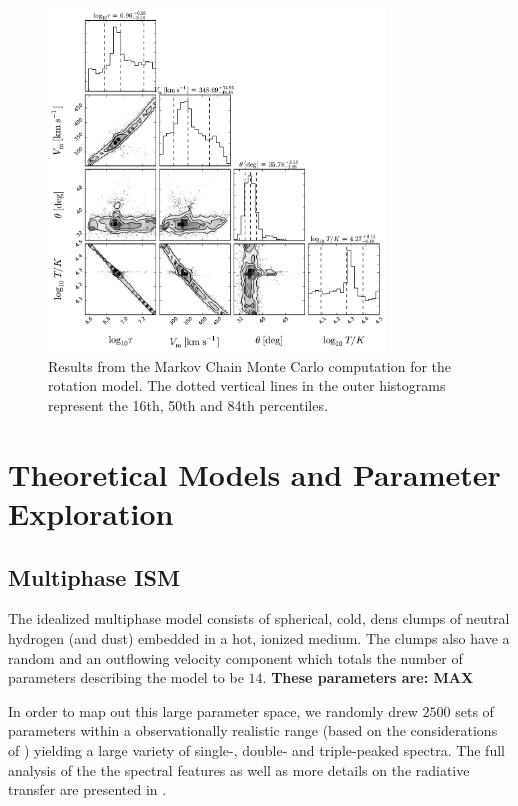 \documentclass[a4,useAMS,usenatbib,usegraphicx]{mn2e}
\begin{document}
\begin{figure}
\begin{center}
\includegraphics[width=0.8\textwidth]{emcee_results.pdf}
\caption{Results from the Markov Chain Monte Carlo computation for
    the rotation model. The dotted vertical lines in the outer histograms 
	represent the 16th, 50th and 84th percentiles. \label{emceeresults}} 
\end{center}
\end{figure}


\section{Theoretical Models and Parameter Exploration}


\subsection{Multiphase ISM} 

The idealized multiphase model consists of spherical, cold, dens
clumps of neutral hydrogen (and dust) embedded in a hot, ionized
medium. 
The clumps also have a random and an outflowing velocity
component which totals the number of parameters describing the model
to be $14$.  {\bf These parameters are: MAX}

In order to map out this large parameter space, we randomly drew
$2500$ sets of parameters within a observationally realistic range
(based on the considerations of \citep{Laursen2013ApJ...766..124L})
yielding a large variety of single-, double- and triple-peaked
spectra. 
The full analysis of the the spectral features as well as
more details on the radiative transfer are presented in
\citep{Gronke2016}.    
\end{document}
